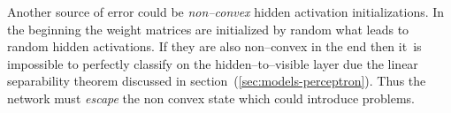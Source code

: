 Another source of error could be \emph{non--convex} hidden activation initializations. In the beginning the weight matrices are initialized by random what leads to random hidden activations. If they are also non--convex in the end then it~is impossible to perfectly classify on the hidden--to--visible layer due the linear separability theorem discussed in section~(\ref{sec:models-perceptron}). Thus the network must \emph{escape} the non convex state which could introduce problems. 



